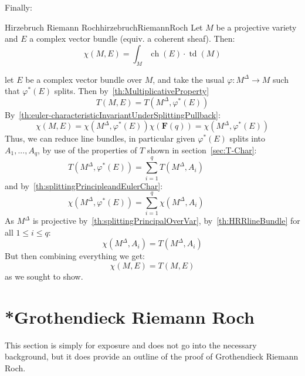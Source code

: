 \documentclass{book}
\newenvironment{Proof}[1][]
  {\begin{ProofTcb}[#1]}
  {\end{ProofTcb}}
\renewcommand{\phi}{\varphi}
\newcommand{\ch}{{\operatorname{ch}}}
\newcommand{\td}{{\operatorname{td}}}
\renewcommand{\ch}{{\operatorname{ch}}}
\begin{document}
Finally:

\begin{thm}{Hirzebruch Riemann Roch}{hirzebruchRiemannRoch}
  Let $M$ be a projective variety and $E$ a complex vector bundle (equiv. a coherent sheaf). Then:
  \[
    \chi(M, E) = \int_M \ch(E)\cdot \td(M)
  \]
\end{thm}

\begin{Proof}
  let $E$ be a complex vector bundle over $M$, and take the usual $\phi: M^\Delta \to
  M$ such that $\phi^*(E)$ splits. Then by~\cref{th:MultiplicativeProperty}
  \[
    T(M, E) = T(M^\Delta, \phi^*(E))
  \]
  By~\cref{th:euler-characteristicInvariantUnderSplittingPullback}:
  \[
    \chi(M, E) = \chi(M^\Delta, \phi^*(E))\chi(\mathbf{F}(q)) = \chi(M^\Delta, \phi^*(E))
  \]
  Thus, we can reduce line bundles, in particular given $\phi^*(E)$ splits into $A_1, ..., A_q$, by use of the
  properties of $T$ shown in section~\ref{sec:T-Char}:
  \[
    T(M^\Delta, \phi^*(E))  = \sum_{i=1}^q T(M^\Delta, A_i) \qquad \text{} \qquad
  \]
  and by~\cref{th:splittingPrincipleandEulerChar}:
  \[
    \chi(M^\Delta, \phi^*(E))   = \sum_{i=1}^q \chi(M^\Delta, A_i) \qquad \text{} \qquad
  \]
  As $M^\Delta$ is projective by~\cref{th:splittingPrincipalOverVar}, by~\cref{th:HRRlineBundle} for all $1 \le i \le q$:
  \[
    \chi(M^\Delta, A_i) = T(M^\Delta, A_i)
  \]
  But then combining everything we get:
  \[
    \chi(M,E) = T(M, E)
  \]
  as we sought to show.
\end{Proof}


\section{*Grothendieck Riemann Roch}\label{sec:GRR}

This section is simply for exposure and does not go into the necessary background, but it does provide an
outline of the proof of Grothendieck Riemann Roch.
\end{document}
